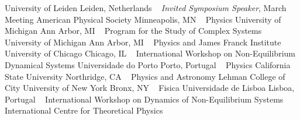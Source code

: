     University of Leiden
    \newline
Leiden, Netherlands
\newline
~
\Gap
{}
\textit{Invited Symposium Speaker}, March Meeting
\newline
    American Physical Society 
    \newline
Minneapolis, MN
\newline
~
\Gap
{}
Physics
\newline
    University of Michigan
    \newline
Ann Arbor, MI
\newline
~
\Gap
{}
Program for the Study of Complex Systems
\newline
    University of Michigan
    \newline
Ann Arbor, MI
\newline
~
\Gap
{}
Physics and James Franck Institute
\newline
    University of Chicago
    \newline
Chicago, IL
\newline
~
\Gap
{}
International Workshop on Non-Equilibrium Dynamical Systems
\newline
    Universidade do Porto
    \newline
Porto, Portugal
\newline
~
\Gap
{}
Physics
\newline
    California State University
    \newline
Northridge, CA
\newline
~
\Gap
{}
Physics and Astronomy
\newline
    Lehman College of City University of New York
    \newline
Bronx, NY
\newline
~
\Gap
{}
Fisica
\newline
    Universidade de Lisboa
    \newline
Lisboa, Portugal
\newline
~
\Gap
{}
International Workshop on Dynamics of Non-Equilibrium Systems
\newline
    International Centre for Theoretical Physics
    \newline
